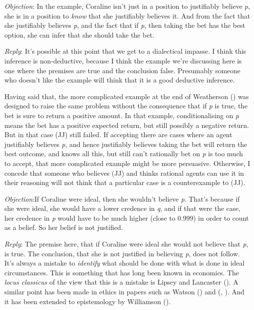 \documentclass[
  11pt,
  letterpaper,
  DIV=11,
  numbers=noendperiod,
  twoside]{scrartcl}
\begin{document}
\emph{Objection}: In the example, Coraline isn't just in a position to
justifiably believe \emph{p}, she is in a position to \emph{know} that
she justifiably believes it. And from the fact that she justifiably
believes \emph{p}, and the fact that if \emph{p}, then taking the bet
has the best option, she can infer that she should take the bet.

\emph{Reply}: It's possible at this point that we get to a dialectical
impasse. I think this inference is non-deductive, because I think the
example we're discussing here is one where the premises are true and the
conclusion false. Presumably someone who doesn't like the example will
think that it is a good deductive inference.

Having said that, the more complicated example at the end of Weatherson
() was designed to raise the
same problem without the consequence that if \emph{p} is true, the bet
is sure to return a positive amount. In that example, conditionalising
on \emph{p} means the bet has a positive expected return, but still
possibly a negative return. But in that case (JJ) still failed. If
accepting there are cases where an agent justifiably believes \emph{p},
and hence justifiably believes taking the bet will return the best
outcome, and knows all this, but still can't rationally bet on \emph{p}
is too much to accept, that more complicated example might be more
persuasive. Otherwise, I concede that someone who believes (JJ) and
thinks rational agents can use it in their reasoning will not think that
a particular case is a counterexample to (JJ).

\emph{Objection}:If Coraline were ideal, then she wouldn't believe
\emph{p}. That's because if she were ideal, she would have a lower
credence in \emph{q}, and if that were the case, her credence in
\emph{p} would have to be much higher (close to 0.999) in order to count
as a belief. So her belief is not justified.

\emph{Reply}: The premise here, that if Coraline were ideal she would
not believe that \emph{p}, is true. The conclusion, that she is not
justified in believing \emph{p}, does not follow. It's always a mistake
to \emph{identify} what should be done with what is done in ideal
circumstances. This is something that has long been known in economics.
The \emph{locus classicus} of the view that this is a mistake is Lipsey
and Lancaster (). A similar point
has been made in ethics in papers such as Watson
() and
(,
). And it has been extended to
epistemology by Williamson ().
\end{document}
